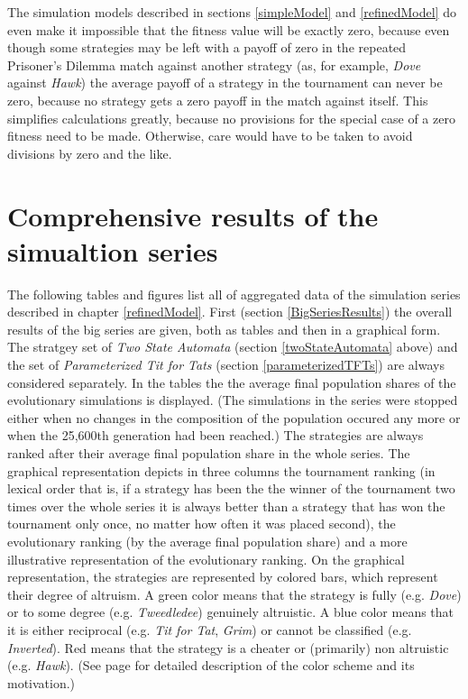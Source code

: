 The simulation models described in sections \ref{simpleModel} and
\ref{refinedModel} do even make it impossible that the fitness value
will be exactly zero, because even though some strategies may be left
with a payoff of zero in the repeated Prisoner's Dilemma match against
another strategy (as, for example, {\em Dove} against {\em Hawk}) the
average payoff of a strategy in the tournament can never be zero,
because no strategy gets a zero payoff in the match against itself.
This simplifies calculations greatly, because no provisions for the
special case of a zero fitness need to be made. Otherwise, care would
have to be taken to avoid divisions by zero and the like.

\newpage
\section{Comprehensive results of the simualtion series}
\label{completeTables}

The following tables and figures list all of aggregated data of the simulation
series described in chapter \ref{refinedModel}. First (section
\ref{BigSeriesResults}) the overall results of the big series are given, both
as tables and then in a graphical form. The stratgey set of {\em Two State
Automata} (section \ref{twoStateAutomata} above) and the set of {\em
Parameterized Tit for Tats} (section \ref{parameterizedTFTs}) are always
considered separately. In the tables the the average final population shares
of the evolutionary simulations is displayed. (The simulations in the series
were stopped either when no changes in the composition of the population
occured any more or when the 25,600th generation had been reached.) The
strategies are always ranked after their average final population share in the
whole series. The graphical representation depicts in three columns the
tournament ranking (in lexical order that is, if a strategy has been the the
winner of the tournament two times over the whole series it is always better
than a strategy that has won the tournament only once, no matter how often it
was placed second), the evolutionary ranking (by the average final population
share) and a more illustrative representation of the evolutionary ranking. On
the graphical representation, the strategies are represented by colored bars,
which represent their degree of altruism. A green color means that the strategy
is fully (e.g. {\em Dove}) or to some degree (e.g. {\em Tweedledee}) genuinely
altruistic. A blue color means that it is either reciprocal (e.g. {\em Tit for
Tat}, {\em Grim}) or cannot be classified (e.g. {\em Inverted}). Red means that
the strategy is a cheater or (primarily) non altruistic (e.g. {\em Hawk}). (See
page \pageref{colorScheme} for detailed description of the color scheme and its
motivation.)

